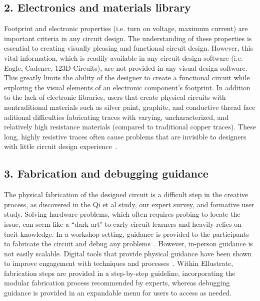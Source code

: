 \documentclass{sigchi}
\begin{document}
\subsection{2. Electronics and materials library}
Footprint and electronic properties (i.e. turn on voltage, maximum current) are important criteria in any circuit design. The understanding of these properties is essential to creating visually pleasing and functional circuit design. However, this vital information, which is readily available in any circuit design software (i.e. Eagle, Cadence, 123D Circuits), are not provided in any visual design software. This greatly limits the ability of the designer to create a functional circuit while exploring the visual elements of an electronic component's footprint. In addition to the lack of electronic libraries, users that create physical circuits with nontraditional materials such as silver paint, graphite, and conductive thread face aditional difficulties fabricating traces with varying, uncharacterized, and relatively high resistance materials (compared to traditional copper traces). These long, highly resistive traces often cause problems that are invisible to designers with little circuit design experience~\cite{admin:2009wf}. 

\subsection{3. Fabrication and debugging guidance}
  The physical fabrication of the designed circuit is a difficult step in the creative process, as discovered in the Qi et al study, our expert survey, and formative user study. Solving hardware problems, which often requires probing to locate the issue, can seem like a ``dark art" to early circuit learners and heavily relies on tacit knowledge. In a workshop setting, guidance is provided to the participants to fabricate the circuit and debug any problems~\cite{qi_sketching_2014}. However, in-person guidance is not easily scalable. Digital tools that provide physical guidance have been shown to improve engagement with techniques and processes~\cite{anonmyzied_proxy}. Within Ellustrate, fabrication steps are provided in a step-by-step guideline, incorporating the modular fabrication process recommended by experts, whereas debugging guidance is provided in an expandable menu for users to access as needed. 
\end{document}
